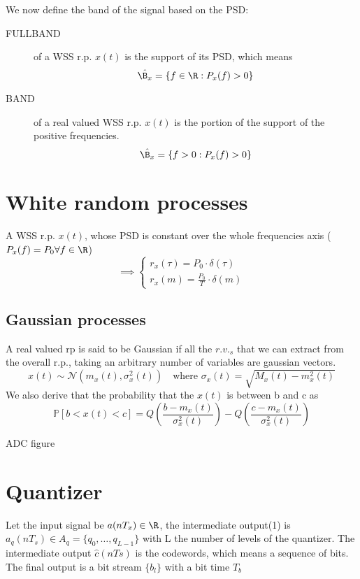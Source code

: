 We now define the band of the signal based on the PSD:

\begin{description}
  \item[FULLBAND] of a WSS r.p. $x(t)$ is the support of its PSD, which means
  $$\hat{\B_x} = \lbrace f \in \R : P_x(f)>0\rbrace$$
  \item[BAND] of a real valued WSS r.p. $x(t)$ is the portion of the support of the positive frequencies.
  $$\hat{\B_x} = \lbrace f>0 : P_x(f)>0\rbrace$$
\end{description}

\section{White random processes}
A WSS r.p. $x(t)$, whose PSD is constant over the whole frequencies axis ($P_x(f) = P_0 \forall f \in \R$)
\begin{equation}
  \implies
  \begin{cases}
    r_x(\tau) = P_0 \cdot \delta(\tau) \\
    r_x(m) = \frac{P_0}{T} \cdot \delta(m)
  \end{cases}
\end{equation}
\subsection{Gaussian processes}
A real valued rp is said to be Gaussian if all the $r.v._s$ that we can extract from the overall r.p., taking an arbitrary number of variables are gaussian vectors.
\begin{equation}
  x(t)\sim \mathcal{N} (m_x(t),\sigma^2_x(t)) \quad \text{where } \sigma_x(t) =  \sqrt{M_x(t)-m_x^2(t)}
\end{equation}
We also derive that the probability that the $x(t)$ is between b and c as
\begin{equation}
  \mathbb{P}[b<x(t)<c] = Q\left(\frac{b-m_x(t)}{\sigma_x^2(t)}\right)-Q\left(\frac{c-m_x(t)}{\sigma_x^2(t)}\right)
\end{equation}

ADC figure

\section{Quantizer}
Let the input signal be $a(n T_x) \in \R$, the intermediate output(1) is $a_q(nT_s) \in A_q = \lbrace q_0,\dots,q_{L-1} \rbrace$ with L the number of levels of the quantizer.
The intermediate output $\hat{c}(n Ts)$ is the codewords, which means a sequence of bits. The final output is a bit stream $\lbrace b_l \rbrace$ with a bit time $T_b$

